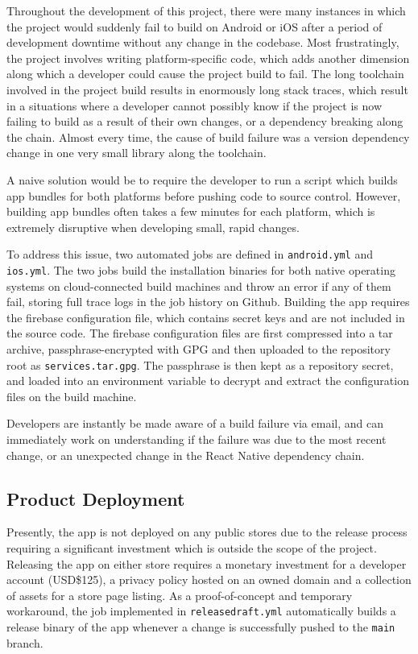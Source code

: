 Throughout the development of this project, there were many instances in which the project would suddenly fail to build on Android or iOS after a period of development downtime without any change in the codebase. Most frustratingly, the project involves writing platform-specific code, which adds another dimension along which a developer could cause the project build to fail. The long toolchain involved in the project build results in enormously long stack traces, which result in a situations where a developer cannot possibly know if the project is now failing to build as a result of their own changes, or a dependency breaking along the chain. Almost every time, the cause of build failure was a version dependency change in one very small library along the toolchain.

A naive solution would be to require the developer to run a script which builds app bundles for both platforms before pushing code to source control. However, building app bundles often takes a few minutes for each platform, which is extremely disruptive when developing small, rapid changes.

To address this issue, two automated jobs are defined in \texttt{android.yml} and \texttt{ios.yml}. The two jobs build the installation binaries for both native operating systems on cloud-connected build machines and throw an error if any of them fail, storing full trace logs in the job history on Github. Building the app requires the firebase configuration file, which contains secret keys and are not included in the source code. The firebase configuration files are first compressed into a tar archive, passphrase-encrypted with GPG and then uploaded to the repository root as \texttt{services.tar.gpg}. The passphrase is then kept as a repository secret, and loaded into an environment variable to decrypt and extract the configuration files on the build machine.

Developers are instantly be made aware of a build failure via email, and can immediately work on understanding if the failure was due to the most recent change, or an unexpected change in the React Native dependency chain.


\subsection{Product Deployment}
Presently, the app is not deployed on any public stores due to the release process requiring a significant investment which is outside the scope of the project. Releasing the app on either store requires a monetary investment for a developer account (USD\$125), a privacy policy hosted on an owned domain and a collection of assets for a store page listing. As a proof-of-concept and temporary workaround, the job implemented in \texttt{releasedraft.yml} automatically builds a release binary of the app whenever a change is successfully pushed to the \texttt{main} branch.

